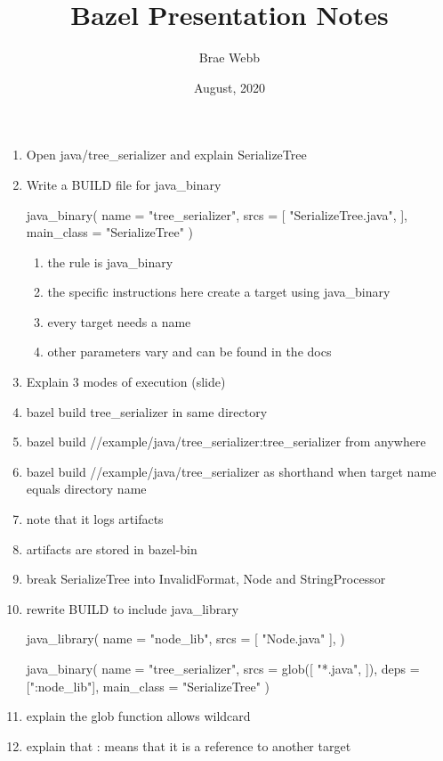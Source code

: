 \documentclass{article}
\title{Bazel Presentation Notes}
\author{Brae Webb}
\date{August, 2020}
\begin{document}
    \maketitle

\begin{enumerate}
    \item Open java/tree\_serializer and explain SerializeTree
    \item Write a BUILD file for java\_binary
\begin{bazel}
java_binary(
    name = "tree_serializer",
    srcs = [
        "SerializeTree.java",
    ],
    main_class = "SerializeTree"
)
\end{bazel}
    \begin{enumerate}
        \item the rule is java\_binary
        \item the specific instructions here create a target using java\_binary
        \item every target needs a name
        \item other parameters vary and can be found in the docs
    \end{enumerate}
    \item Explain 3 modes of execution (slide)
    \item bazel build tree\_serializer in same directory
    \item bazel build //example/java/tree\_serializer:tree\_serializer from anywhere
    \item bazel build //example/java/tree\_serializer as shorthand when target
    name equals directory name
    \item note that it logs artifacts
    \item artifacts are stored in bazel-bin
    \item break SerializeTree into InvalidFormat, Node and StringProcessor
    \item rewrite BUILD to include java\_library
\begin{bazel}
java_library(
    name = "node_lib",
    srcs = [
        "Node.java"
    ],
)

java_binary(
    name = "tree_serializer",
    srcs = glob([
        "*.java",
    ]),
    deps = [":node_lib"],
    main_class = "SerializeTree"
)    
\end{bazel}
    \item explain the glob function allows wildcard
    \item explain that : means that it is a reference to another target
\end{enumerate}
\end{document}
